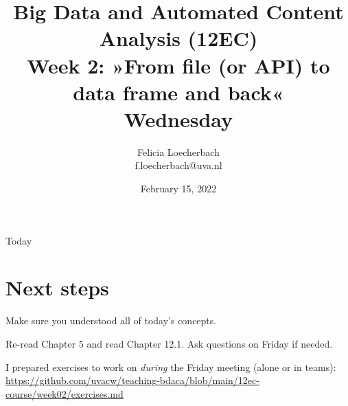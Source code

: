 

\graphicspath{{../../resources/img/}}




\title[Big Data and Automated Content Analysis]{\textbf{Big Data and Automated Content Analysis (12EC)} 
\\Week 2: »From file (or API) to data frame and back«
\\Wednesday}
\author[Felicia Loecherbach]{Felicia Loecherbach\\ \footnotesize{f.loecherbach@uva.nl\\}}
\date{February 15, 2022}


\begin{frame}{}
	\titlepage
\end{frame}

\begin{frame}{Today}
	\tableofcontents
\end{frame}



	










\section{Next steps}




\begin{frame}[standout]
Make sure you understood all of today's concepts.

Re-read Chapter 5 and read Chapter 12.1. Ask questions on Friday if needed.

I prepared exercises to work on \emph{during} the Friday meeting (alone or in teams):
\large{\url{https://github.com/uvacw/teaching-bdaca/blob/main/12ec-course/week02/exercises.md}}
\end{frame}





\begin{frame}
	\printbibliography
\end{frame}




